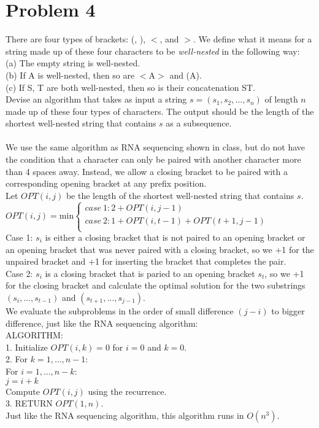 \documentclass[10pt,letterpaper]{article}
\newcommand\tab[1][0.5cm]{\hspace*{#1}}
\begin{document}
\section{Problem 4}
There are four types of brackets: (,  ), $<$, and $>$. We define what it means for a string made up of these four characters to be {\em well-nested} in the following way:\\
(a) The empty string is well-nested.\\
(b) If A is well-nested, then so are $<$A$>$ and (A).\\
(c) If S, T are both well-nested, then so is their concatenation ST.\\
Devise an algorithm that takes as input a string $s = (s_1,s_2,...,s_n)$ of length $n$ made up of these four types of characters. The output should be the length of the shortest well-nested string that contains $s$ as a subsequence.\\\\
We use the same algorithm as RNA sequencing shown in class, but do not have the condition that a character can only be paired with another character more than 4 spaces away. Instead, we allow a closing bracket to be paired with a corresponding opening bracket at any prefix position.\\
Let $OPT(i,j)$ be the length of the shortest well-nested string that contains $s$.\\
$OPT(i,j)=$min$
\begin{cases}
case \ 1: 2 + OPT(i,j-1) \\
case \ 2: 1 + OPT(i,t-1)+OPT(t+1,j-1) \\
\end{cases}$\\
Case 1: $s_i$ is either a closing bracket that is not paired to an opening bracket or an opening bracket that was never paired with a closing bracket, so we +1 for the unpaired bracket and +1 for inserting the bracket that completes the pair.\\
Case 2: $s_i$ is a closing bracket that is paried to an opening bracket $s_t$, so we +1 for the closing bracket and calculate the optimal solution for the two substrings $(s_i,\dots,s_{t-1})$ and $(s_{t+1},\dots,s_{j-1})$.\\
We evaluate the subproblems in the order of small difference $(j-i)$ to bigger difference, just like the RNA sequencing algorithm:\\
ALGORITHM:\\
1. Initialize $OPT(i,k)=0$ for $i=0$ and $k=0$.\\
2. For $k=1,\dots,n-1$:\\
\tab For $i=1,\dots,n-k$:\\
\tab \tab $j = i + k$\\
\tab \tab Compute $OPT(i,j)$ using the recurrence.\\
3. RETURN $OPT(1,n)$.\\
Just like the RNA sequencing algorithm, this algorithm runs in $O(n^3)$.
\end{document}
